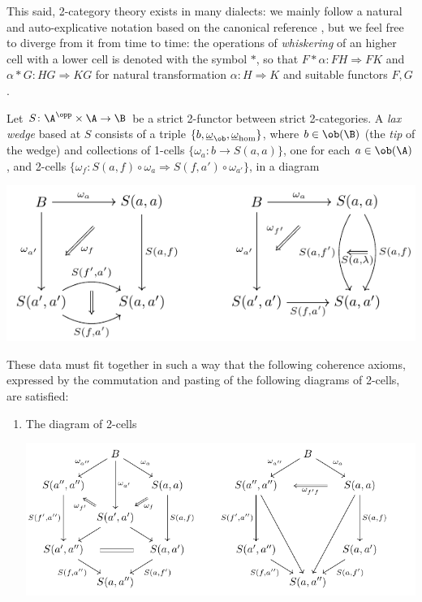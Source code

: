 This said, 2-category theory exists in many dialects: we mainly follow a natural and auto-explicative notation based on the canonical reference \cite{2catlimits}, but we feel free to diverge from it from time to time: the operations of \emph{whiskering} of an higher cell with a lower cell is denoted with the symbol $*$, so that $F * \alpha \colon FH\Rightarrow FK$ and $\alpha*G \colon HG\Rightarrow KG$ for natural transformation $\alpha\colon H \Rightarrow K$ and suitable functors $F,G$.
\begin{definition}\label{laxwedge}
Let $S\colon \A^\opp\times \A \to \B$ be a strict 2-functor between strict 2-categories. A \emph{lax wedge} based at $S$ consists of a triple $\{b, \underline{\omega}_{\ob}, \underline{\omega}_{\hom}\}$, where $b\in \ob(\B)$ (the \emph{tip} of the wedge) and collections of 1-cells $\big\{ \omega_a\colon b\to S(a,a)\big\}$, one for each $a\in \ob(\A)$, and 2-cells $\big\{ \omega_f\colon S(a, f)\circ \omega_{a} \Rightarrow S(f, a')\circ \omega_{a'} \big\}$, in a diagram
\begin{center}
\includegraphics[scale=1]{figures/fig15}
\end{center}
These data must fit together in such a way that the following coherence axioms, expressed by the commutation and pasting of the following diagrams of 2-cells, are satisfied:
\begin{enumerate}[label=(\oldstylenums{\arabic*})]
\item The diagram of 2-cells
\begin{center}
\includegraphics[scale=1]{figures/fig16}

\end{center}
\end{enumerate}
\end{definition}
